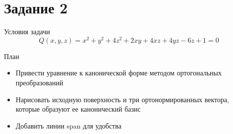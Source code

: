 \section{Задание 2 }
\plan
\begin{frame}{Условия задачи}
 \[
Q\left(x,y,z\right)=x^{2}+y^{2}+4z^{2}+2xy+4xz+4yz-6z+1=0
  \]
    \begin{block}{План}
        \begin{itemize}
            \item Привести уравнение к канонической форме методом ортогональных преобразований
            \item Нарисовать исходную поверхность и три ортонормированных вектора, которые образуют ее канонический базис
            \item Добавить линии span для удобства
        \end{itemize}
    \end{block}
\end{frame}
